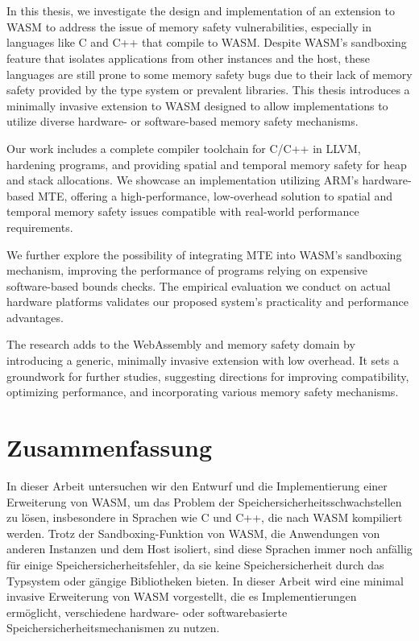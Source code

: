 \chapter{\abstractname}

In this thesis, we investigate the design and implementation of an extension to \acf*{WASM} to address the issue of memory safety vulnerabilities, especially in languages like C and C++ that compile to \acs*{WASM}.
Despite \acs*{WASM}'s sandboxing feature that isolates applications from other instances and the host, these languages are still prone to some memory safety bugs due to their lack of memory safety provided by the type system or prevalent libraries.
This thesis introduces a minimally invasive extension to \acs*{WASM} designed to allow implementations to utilize diverse hardware- or software-based memory safety mechanisms.

Our work includes a complete compiler toolchain for C/C++ in LLVM, hardening programs, and providing spatial and temporal memory safety for heap and stack allocations.
We showcase an implementation utilizing ARM's hardware-based \acf*{MTE}, offering a high-performance, low-overhead solution to spatial and temporal memory safety issues compatible with real-world performance requirements.

We further explore the possibility of integrating \acs*{MTE} into \acs*{WASM}'s sandboxing mechanism, improving the performance of programs relying on expensive software-based bounds checks.
The empirical evaluation we conduct on actual hardware platforms validates our proposed system's practicality and performance advantages.

The research adds to the WebAssembly and memory safety domain by introducing a generic, minimally invasive extension with low overhead.
It sets a groundwork for further studies, suggesting directions for improving compatibility, optimizing performance, and incorporating various memory safety mechanisms.

\chapter{Zusammenfassung}\label{ch:zusammenfassung}

In dieser Arbeit untersuchen wir den Entwurf und die Implementierung einer Erweiterung von \acf*{WASM}, um das Problem der Speichersicherheitsschwachstellen zu lösen, insbesondere in Sprachen wie C und C++, die nach \acs*{WASM} kompiliert werden.
Trotz der Sandboxing-Funktion von \acs*{WASM}, die Anwendungen von anderen Instanzen und dem Host isoliert, sind diese Sprachen immer noch anfällig für einige Speichersicherheitsfehler, da sie keine Speichersicherheit durch das Typsystem oder gängige Bibliotheken bieten.
In dieser Arbeit wird eine minimal invasive Erweiterung von \acs*{WASM} vorgestellt, die es Implementierungen ermöglicht, verschiedene hardware- oder softwarebasierte Speichersicherheitsmechanismen zu nutzen.

